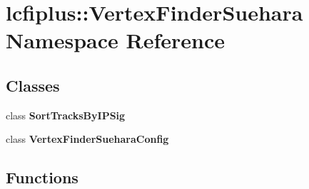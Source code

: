 \section{lcfiplus\+:\+:Vertex\+Finder\+Suehara Namespace Reference}
\label{namespacelcfiplus_1_1VertexFinderSuehara}
\subsection*{Classes}
\begin{DoxyCompactItemize}
\item 
class \textbf{ Sort\+Tracks\+By\+I\+P\+Sig}
\item 
class \textbf{ Vertex\+Finder\+Suehara\+Config}
\end{DoxyCompactItemize}
\subsection*{Functions}
